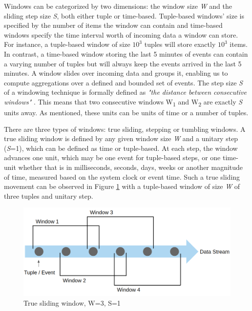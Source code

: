 Windows can be categorized by two dimensions: the window size \textit{W} and the sliding step size \textit{S}, both either tuple or time-based. Tuple-based windows' size is specified by the number of items the window can contain and time-based windows specify the time interval worth of incoming data a window can store. For instance, a tuple-based window of size $10^3$ tuples will store exactly $10^3$ items. In contrast, a time-based window storing the last 5 minutes of events can contain a varying number of tuples but will always keep the events arrived in the last 5 minutes. A window slides over incoming data and groups it, enabling us to compute aggregations over a defined and bounded set of events. The step size \textit{S} of a windowing technique is formally defined as \textit{"the distance between consecutive windows"} \cite{Botan-SECRET}. This means that two consecutive windows W\textsubscript{1} and W\textsubscript{2} are exactly \textit{S} units away. As mentioned, these units can be units of time or a number of tuples.

There are three types of windows: true sliding, stepping or tumbling windows.
A true sliding window is defined by any given window size \textit{W} and a unitary step (\textit{S}=1), which can be defined as time or tuple-based. At each step, the window advances one unit, which may be one event for tuple-based steps, or one time-unit whether that is in milliseconds, seconds, days, weeks or another magnitude of time, measured based on the system clock or event time. Such a true sliding movement can be observed in Figure \ref{fig:sliding-window} with a tuple-based window of size \textit{W} of three tuples and unitary step. 

\begin{figure}[!htb]
    \begin{center}
      \hspace*{0.6in}
      \includegraphics[scale=0.4]{figures/sliding.png}
      \caption[True sliding window]{True sliding window, W=3, S=1}
      \label{fig:sliding-window} 
    \end{center}
\end{figure} 

